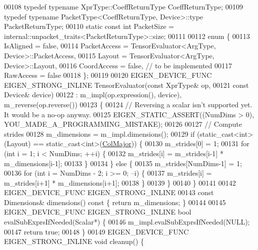 \begin{DoxyCode}
00108   \textcolor{keyword}{typedef} \textcolor{keyword}{typename} XprType::CoeffReturnType CoeffReturnType;
00109   \textcolor{keyword}{typedef} \textcolor{keyword}{typename} PacketType<CoeffReturnType, Device>::type PacketReturnType;
00110   \textcolor{keyword}{static} \textcolor{keyword}{const} \textcolor{keywordtype}{int} PacketSize = internal::unpacket\_traits<PacketReturnType>::size;
00111 
00112   \textcolor{keyword}{enum} \{
00113     IsAligned = \textcolor{keyword}{false},
00114     PacketAccess = TensorEvaluator<ArgType, Device>::PacketAccess,
00115     Layout = TensorEvaluator<ArgType, Device>::Layout,
00116     CoordAccess = \textcolor{keyword}{false},  \textcolor{comment}{// to be implemented}
00117     RawAccess = \textcolor{keyword}{false}
00118   \};
00119 
00120   EIGEN\_DEVICE\_FUNC EIGEN\_STRONG\_INLINE TensorEvaluator(\textcolor{keyword}{const} XprType& op,
00121                                                         \textcolor{keyword}{const} Device& device)
00122       : m\_impl(op.expression(), device), m\_reverse(op.reverse())
00123   \{
00124     \textcolor{comment}{// Reversing a scalar isn't supported yet. It would be a no-op anyway.}
00125     EIGEN\_STATIC\_ASSERT((NumDims > 0), YOU\_MADE\_A\_PROGRAMMING\_MISTAKE);
00126 
00127     \textcolor{comment}{// Compute strides}
00128     m\_dimensions = m\_impl.dimensions();
00129     \textcolor{keywordflow}{if} (static\_cast<int>(Layout) == static\_cast<int>(\hyperlink{group__enums_ggaacded1a18ae58b0f554751f6cdf9eb13a0cbd4bdd0abcfc0224c5fcb5e4f6669a}{ColMajor})) \{
00130       m\_strides[0] = 1;
00131       \textcolor{keywordflow}{for} (\textcolor{keywordtype}{int} i = 1; i < NumDims; ++i) \{
00132         m\_strides[i] = m\_strides[i-1] * m\_dimensions[i-1];
00133       \}
00134     \} \textcolor{keywordflow}{else} \{
00135       m\_strides[NumDims-1] = 1;
00136       \textcolor{keywordflow}{for} (\textcolor{keywordtype}{int} i = NumDims - 2; i >= 0; --i) \{
00137         m\_strides[i] = m\_strides[i+1] * m\_dimensions[i+1];
00138       \}
00139     \}
00140   \}
00141 
00142   EIGEN\_DEVICE\_FUNC EIGEN\_STRONG\_INLINE
00143   \textcolor{keyword}{const} Dimensions& dimensions()\textcolor{keyword}{ const }\{ \textcolor{keywordflow}{return} m\_dimensions; \}
00144 
00145   EIGEN\_DEVICE\_FUNC EIGEN\_STRONG\_INLINE \textcolor{keywordtype}{bool} evalSubExprsIfNeeded(Scalar*) \{
00146     m\_impl.evalSubExprsIfNeeded(NULL);
00147     \textcolor{keywordflow}{return} \textcolor{keyword}{true};
00148   \}
00149   EIGEN\_DEVICE\_FUNC EIGEN\_STRONG\_INLINE \textcolor{keywordtype}{void} cleanup() \{

\end{DoxyCode}
